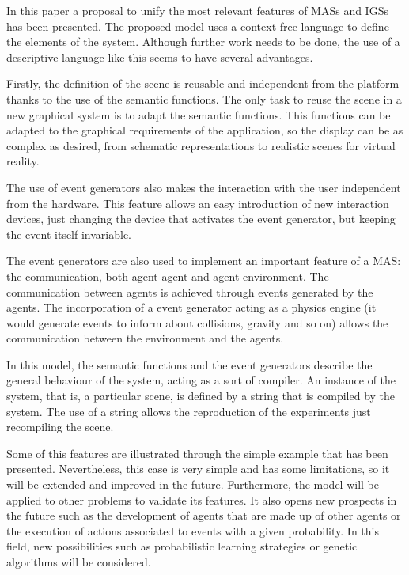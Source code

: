 \documentclass[runningheads]{llncs}
\begin{document}
In this paper a proposal to unify the most relevant features of MASs and IGSs has been presented.
The proposed model uses a context-free language to define the elements of the system. Although
further work needs to be done, the use of a descriptive language like this seems to have several
advantages.

Firstly, the definition of the scene is reusable and independent from the platform thanks to the
use of the semantic functions. The only task to reuse the scene in a new graphical system is to
adapt the semantic functions. This functions can be adapted to the graphical requirements of the
application, so the display can be as complex as desired, from schematic representations to
realistic scenes for virtual reality.

The use of event generators also makes the interaction with the user independent from the hardware.
This feature allows an easy introduction of new interaction devices, just changing the device that
activates the event generator, but keeping the event itself invariable.

The event generators are also used to implement an important feature of a MAS: the communication,
both agent-agent and agent-environment. The communication between agents is achieved through events
generated by the agents. The incorporation of a event generator acting as a physics engine (it
would generate events to inform about collisions, gravity and so on) allows the communication
between the environment and the agents.

In this model, the semantic functions and the event generators describe the general behaviour of
the system, acting as a sort of compiler. An instance of the system, that is, a particular scene,
is defined by a string that is compiled by the system. The use of a string allows the reproduction
of the experiments just recompiling the scene.

Some of this features are illustrated through the simple example that has been presented.
Nevertheless, this case is very simple and has some limitations, so it will be extended and
improved in the future. Furthermore, the model will be applied to other problems to validate its
features. It also opens new prospects in the future such as the development of agents that are made
up of other agents or the execution of actions associated to events with a given probability. In
this field, new possibilities such as probabilistic learning strategies or genetic algorithms will
be considered.
\end{document}
